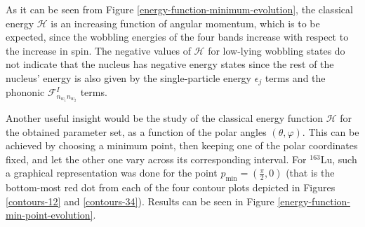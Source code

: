 \documentclass[11pt]{article}
\begin{document}
As it can be seen from Figure \ref{energy-function-minimum-evolution}, the classical energy $\mathcal{H}$ is an increasing function of angular momentum, which is to be expected, since the wobbling energies of the four bands increase with respect to the increase in spin. The negative values of $\mathcal{H}$ for low-lying wobbling states do not indicate that the nucleus has negative energy states since the rest of the nucleus' energy is also given by the single-particle energy $\epsilon_j$ terms and the phononic $\mathcal{F}_{n_{w_1}n_{w_2}}^I$ terms.

Another useful insight would be the study of the classical energy function $\mathcal{H}$ for the obtained parameter set, as a function of the polar angles $(\theta,\varphi)$. This can be achieved by choosing a minimum point, then keeping one of the polar coordinates fixed, and let the other one vary across its corresponding interval. For $^{163}$Lu, such a graphical representation was done for the point $p_\text{min}=\left(\frac{\pi}{2},0\right)$ (that is the bottom-most red dot from each of the four contour plots depicted in Figures \ref{contours-12} and \ref{contours-34}). Results can be seen in Figure \ref{energy-function-min-point-evolution}.
\end{document}
